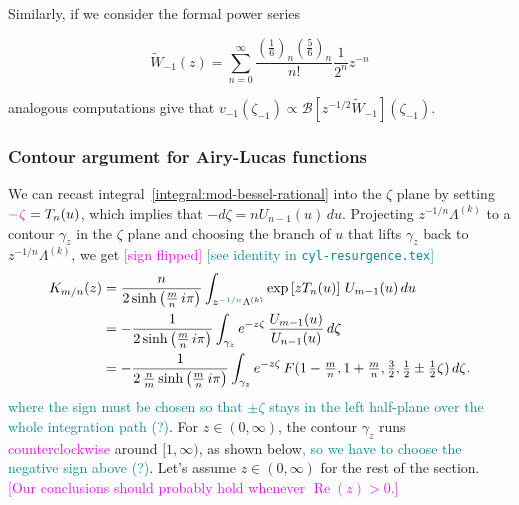 \documentclass{article}
\begin{document}
Similarly, if we consider the formal power series

\begin{equation}
\tilde{W}_{-1}(z)=\sum_{n=0}^{\infty}\frac{\left(\frac{1}{6}\right)_n\left(\frac{5}{6}\right)_n}{n!}\frac{1}{2^n}z^{-n}
\end{equation}

analogous computations give that $v_{-1}(\zeta_{-1})\propto\mathcal{B}\left[z^{-1/2}\tilde{W}_{-1}\right](\zeta_{-1})$.

\color{black}

\subsubsection{Contour argument for Airy-Lucas functions}\label{contour-argument-AL}
We can recast integral~\ref{integral:mod-bessel-rational} into the $\zeta$ plane by setting $\textcolor{magenta}{-\zeta} = T_n(u)$, which implies that $-d\zeta = n U_{n-1}(u)\,du$. Projecting $z^{-1/n} \Lambda^{(k)}$ to a contour $\gamma_z$ in the $\zeta$ plane and choosing the branch of $u$ that lifts $\gamma_z$ back to $z^{-1/n} \Lambda^{(k)}$, we get \textcolor{magenta}{[sign flipped]} \textcolor{DarkCyan}{[see identity in \texttt{cyl-resurgence.tex}]}
\begin{align*}%
K_{m/n}(z) & = \frac{n}{2 \sinh\big(\tfrac{m}{n}\,i\pi\big)} \int_{z^{-\textcolor{DarkCyan}{1/n}}\Lambda^{(k)}} \exp\left[z T_n(u)\right]\,U_{m-1}(u)\,du \\
& = -\frac{1}{2 \sinh\big(\tfrac{m}{n}\,i\pi\big)} \int_{\gamma_z} e^{-z\zeta}\,\frac{U_{m-1}(u)}{U_{n-1}(u)}\,d\zeta \\
& = -\frac{1}{2\,\tfrac{n}{m} \sinh\big(\tfrac{m}{n}\,i\pi\big)} \int_{\gamma_z} e^{-z\zeta}\,F(1 - \tfrac{m}{n}, 1 + \tfrac{m}{n}, \tfrac{3}{2}, \tfrac{1}{2} \pm \tfrac{1}{2}\zeta)\,d\zeta.
\end{align*}
\textcolor{DarkCyan}{where the sign must be chosen so that $\pm\zeta$ stays in the left half-plane over the whole integration path (?)}.
For $z \in (0, \infty)$, the contour $\gamma_z$ runs \textcolor{magenta}{counterclockwise} around $[1, \infty)$, as shown below\textcolor{DarkCyan}{, so we have to choose the negative sign above (?)}. Let's assume $z \in (0, \infty)$ for the rest of the section. \textcolor{magenta}{[Our conclusions should probably hold whenever $\operatorname{Re}(z) > 0$.]}
\end{document}

